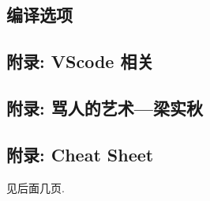 \documentclass[a4paper, twoside]{article}
\begin{document}
\begin{multicols}{2}
			\subsection{编译选项}
				
				



			
			\subsection{附录: VScode 相关}
				
			
			\newpage
			\subsection{附录: 骂人的艺术—梁实秋}
				
			
			\subsection{附录: Cheat Sheet}
				见后面几页.

	\end{multicols}

	

	

	

	\pagestyle{empty}

	\newpage

	\null

	\newpage

	\null


\end{document}
